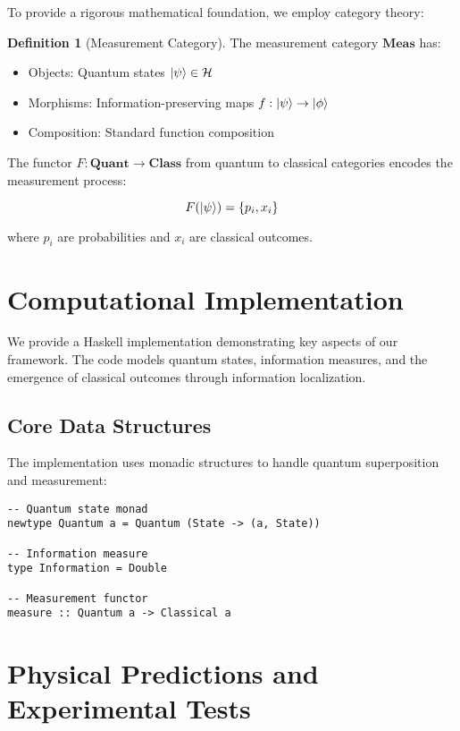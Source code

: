\documentclass[12pt,a4paper]{article}
\theoremstyle{definition}
\newtheorem{definition}{Definition}[section]
\begin{document}
To provide a rigorous mathematical foundation, we employ category theory:

\begin{definition}[Measurement Category]
The measurement category $\mathbf{Meas}$ has:
\begin{itemize}
    \item Objects: Quantum states $\ket{\psi} \in \mathcal{H}$
    \item Morphisms: Information-preserving maps $f: \ket{\psi} \rightarrow \ket{\phi}$
    \item Composition: Standard function composition
\end{itemize}
\end{definition}

The functor $F: \mathbf{Quant} \rightarrow \mathbf{Class}$ from quantum to classical categories encodes the measurement process:

\begin{equation}
F(\ket{\psi}) = \{p_i, x_i\}
\end{equation}

where $p_i$ are probabilities and $x_i$ are classical outcomes.

\section{Computational Implementation}

We provide a Haskell implementation demonstrating key aspects of our framework. The code models quantum states, information measures, and the emergence of classical outcomes through information localization.

\subsection{Core Data Structures}

The implementation uses monadic structures to handle quantum superposition and measurement:

\begin{verbatim}
-- Quantum state monad
newtype Quantum a = Quantum (State -> (a, State))

-- Information measure
type Information = Double

-- Measurement functor
measure :: Quantum a -> Classical a
\end{verbatim}

\section{Physical Predictions and Experimental Tests}
\end{document}
